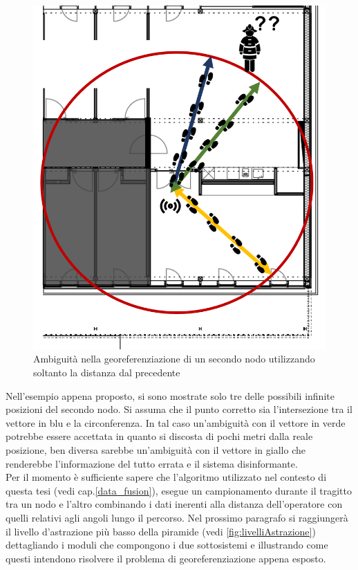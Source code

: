 \begin{figure}[H]
	\centering
	\includegraphics[scale=0.35]{DescrizioneDelSistema/ambiguitDistanza.png}
	\caption{Ambiguità nella georeferenziazione di un secondo nodo utilizzando soltanto la distanza dal precedente }
	\label{fig:ambiguitDistanz}
\end{figure}
Nell'esempio appena proposto, si sono mostrate solo tre delle possibili infinite posizioni del secondo nodo. Si assuma che il punto corretto sia l'intersezione tra il vettore in blu e la circonferenza. In tal caso un'ambiguità con il vettore in verde potrebbe essere accettata in quanto si discosta di pochi metri dalla reale posizione, ben diversa sarebbe un'ambiguità con il vettore in giallo che renderebbe l'informazione del tutto errata e il sistema disinformante.\\
Per il momento è sufficiente sapere che l'algoritmo utilizzato nel contesto di questa tesi (vedi cap.\ref{data_fusion}), esegue un campionamento durante il tragitto tra un nodo e l'altro combinando i dati inerenti alla distanza dell'operatore con quelli relativi agli angoli lungo il percorso.
Nel prossimo paragrafo si raggiungerà il livello d'astrazione più basso della piramide (vedi \ref{fig:livelliAstrazione}) dettagliando i moduli che compongono i due sottosistemi e illustrando come questi intendono risolvere il problema di georeferenziazione appena esposto. \newpage


